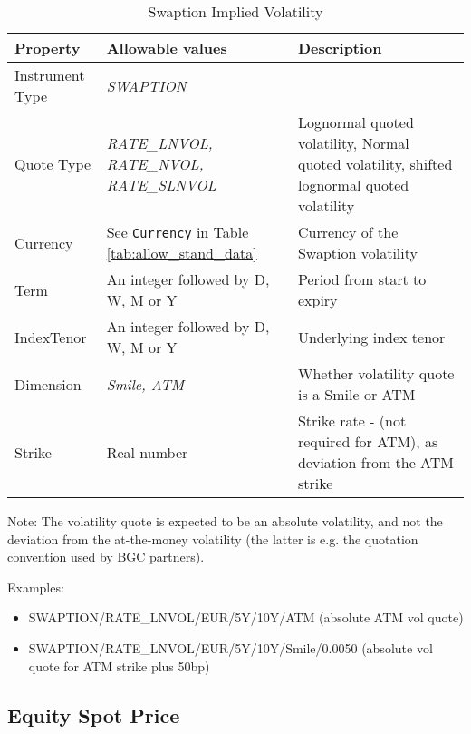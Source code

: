 \begin{table}[H]
\centering
  \begin{tabular}{|p{3cm}|p{3.5cm}|p{7cm}|}
    \hline
    {\bf Property} & {\bf Allowable values} & {\bf Description} \\ \hline
    Instrument Type & \emph{SWAPTION} & \\ \hline
    Quote Type & \emph{RATE\_LNVOL, RATE\_NVOL, RATE\_SLNVOL} & Lognormal quoted volatility, Normal quoted volatility, shifted lognormal quoted volatility\\ \hline
    Currency & See \lstinline!Currency! in Table \ref{tab:allow_stand_data}&  Currency of the Swaption volatility\\ \hline
    Term & An integer followed by D, W, M or Y & Period from start to expiry \\ \hline
    IndexTenor & An integer followed by D, W, M or Y & Underlying index tenor \\ \hline
    Dimension & \emph{Smile, ATM}  & Whether volatility quote is a Smile or ATM \\ \hline
    Strike & Real number & Strike rate - (not required for ATM), as deviation from the ATM strike\\ \hline
  \end{tabular}
  \caption{Swaption Implied Volatility}
  \label{tab:swaptimplvol_quote}
\end{table}


\medskip Note: The volatility quote is expected to be an absolute volatility, and not the deviation from the
at-the-money volatility (the latter is e.g. the quotation convention used by BGC partners).

\medskip
Examples:
\begin{itemize}
\item { SWAPTION/RATE\_LNVOL/EUR/5Y/10Y/ATM} (absolute ATM vol quote)
\item { SWAPTION/RATE\_LNVOL/EUR/5Y/10Y/Smile/0.0050} (absolute vol quote for ATM strike plus 50bp)
\end{itemize}

\subsection{Equity Spot Price}

